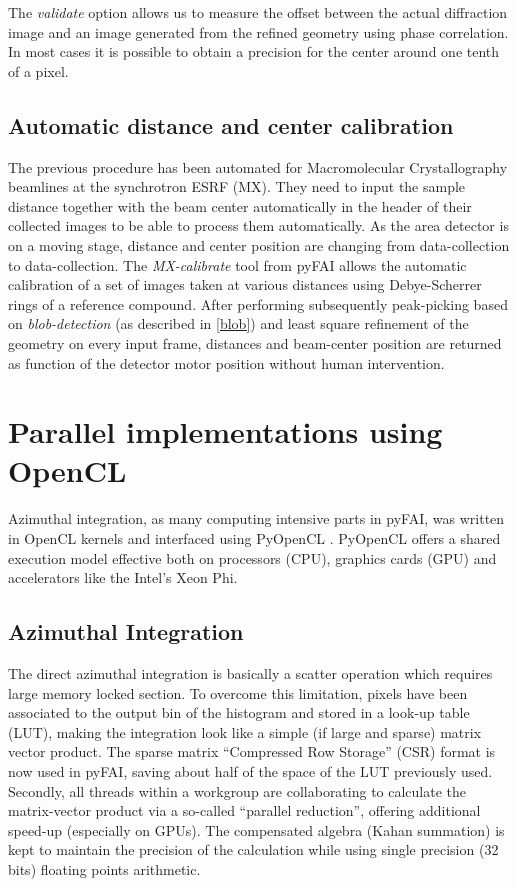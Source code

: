 \documentclass[preprint]{iucr}
\begin{document}
The \textit{validate} option allows us to measure the offset between the actual
diffraction image and an image generated from the refined geometry using phase
correlation. In most cases it is possible to obtain a precision for the
center around one tenth of a pixel.

\subsection{Automatic distance and center calibration}
The previous procedure has been automated for Macromolecular Crystallography
beamlines at the synchrotron ESRF (MX). They need to input the sample
distance together  with the beam center automatically in the header of their
collected images to be able to process them automatically.
As the area detector is on a moving stage, distance and center position are
changing from data-collection to data-collection.
The \textit{MX-calibrate} tool from pyFAI allows the automatic calibration of
a set of images taken at various distances using Debye-Scherrer rings of a
reference compound.
After performing subsequently peak-picking based on \textit{blob-detection}
(as described in \ref{blob}) and least square refinement of the geometry on
every input frame, distances and beam-center position are returned as function
of the detector motor position without human intervention.

\section{Parallel implementations using OpenCL}

Azimuthal integration, as  many computing intensive parts in pyFAI, was 
written in OpenCL kernels and interfaced using PyOpenCL \cite{pyopencl}. 
PyOpenCL offers a
shared execution model effective both on processors (CPU), graphics cards (GPU)
and accelerators like the Intel's Xeon Phi.

\subsection{Azimuthal Integration}
The direct azimuthal integration is basically a scatter operation which
requires large memory locked section.
To overcome this limitation, pixels have been
associated to the output bin of the histogram and stored in a look-up
table (LUT), making the integration look like a simple (if large and sparse)
matrix vector product.
The sparse matrix ``Compressed Row Storage'' (CSR) format is now used in pyFAI,
saving about half of the space of the LUT previously used.
Secondly, all threads within a workgroup are collaborating to calculate the
matrix-vector product via a so-called ``parallel reduction'', offering
additional speed-up (especially on GPUs).
The compensated algebra (Kahan summation) is kept to maintain the precision
of the calculation while using single precision (32 bits) floating points
arithmetic.
\end{document}
